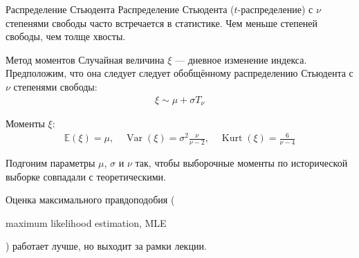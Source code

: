 \documentclass{beamer}
\newcommand{\en}[1]{\begin{otherlanguage}{english}#1\end{otherlanguage}}
\begin{document}
\begin{frame}{Распределение Стьюдента}
\justify
Распределение Стьюдента ($t$-распределение) с $\nu$ степенями свободы часто встречается в статистике. Чем меньше степеней свободы, чем толще хвосты.

\justify
\centering
{}
\end{frame}



\begin{frame}{Метод моментов}
\justify
Случайная величина $\xi$ --- дневное изменение индекса. Предположим, что она следует следует обобщённому распределению Стьюдента с $\nu$ степенями свободы:
\begin{align*}
\xi \sim \mu + \sigma T_{\nu}
\end{align*}

\justify
Моменты $\xi$:
\begin{align*}
\mathbb{E}(\xi) = \mu, \quad
\operatorname{Var}(\xi) = \sigma^2\frac{\nu}{\nu-2}, \quad
\operatorname{Kurt}(\xi) = \frac{6}{\nu - 4}
\end{align*}

\justify
Подгоним параметры $\mu$, $\sigma$ и $\nu$ так, чтобы выборочные моменты по исторической выборке совпадали с теоретическими.

\justify
Оценка максимального правдоподобия (\en{maximum likelihood estimation, MLE}) работает лучше, но выходит за рамки лекции.
\end{frame}
\end{document}
